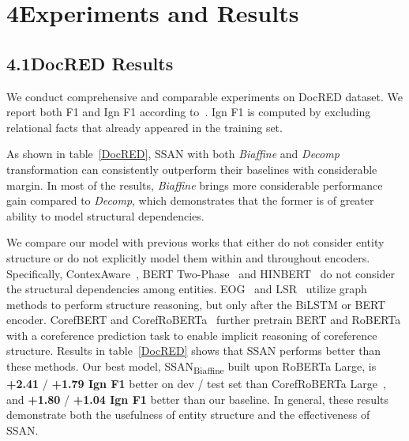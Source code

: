 \documentclass[letterpaper]{article} \usepackage{aaai21}  \usepackage{times}  \usepackage{helvet} \usepackage{courier}  \usepackage[hyphens]{url}  \usepackage{graphicx} \usepackage{booktabs}
\begin{document}
\section{4\quad Experiments and Results}
\subsection{4.1\quad DocRED Results}
We conduct comprehensive and comparable experiments on DocRED dataset.
We report both F1 and Ign F1 according to~\citet{yao-etal-2019-docred}. Ign F1 is computed by excluding relational facts that already appeared in the training set.


As shown in table~\ref{DocRED}, SSAN with both \textit{Biaffine} and \textit{Decomp} transformation can consistently outperform their baselines with considerable margin.
In most of the results, \textit{Biaffine} brings more considerable performance gain compared to \textit{Decomp}, which demonstrates that the former is of greater ability to model structural dependencies.


We compare our model with previous works that either do not consider entity structure or do not explicitly model them within and throughout encoders.
Specifically, ContexAware~\cite{yao-etal-2019-docred}, BERT Two-Phase~\cite{wang2019fine} and HINBERT~\cite{tang2020hin} do not consider the structural dependencies among entities.
EOG~\cite{christopoulou-etal-2019-connecting} and LSR~\cite{nan-etal-2020-reasoning} utilize graph methods to perform structure reasoning, but only after the BiLSTM or BERT encoder.
CorefBERT and CorefRoBERTa~\cite{ye2020coreferential} further pretrain BERT and RoBERTa with a coreference prediction task to enable implicit reasoning of coreference structure.
Results in table~\ref{DocRED} shows that SSAN performs better than these methods. Our best model, SSAN\textsubscript{Biaffine} built upon RoBERTa Large, is \textbf{+2.41} / \textbf{+1.79 Ign F1} better on dev / test set than CorefRoBERTa Large~\cite{ye2020coreferential}, and \textbf{+1.80} / \textbf{+1.04 Ign F1} better than our baseline.
In general, these results demonstrate both the usefulness of entity structure and the effectiveness of SSAN.
\end{document}
